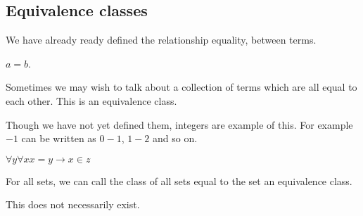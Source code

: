 
\subsection{Equivalence classes}

We have already ready defined the relationship equality, between terms.

\(a=b\).

Sometimes we may wish to talk about a collection of terms which are all equal to each other. This is an equivalence class.

Though we have not yet defined them, integers are example of this. For example \(-1\) can be written as \(0-1\), \(1-2\) and so on.

\(\forall y \forall x x=y\rightarrow x\in z\)

For all sets, we can call the class of all sets equal to the set an equivalence class.

This does not necessarily exist.

